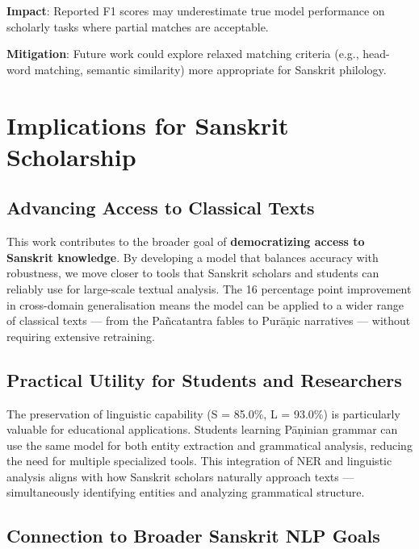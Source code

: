 \textbf{Impact}: Reported F1 scores may underestimate true model performance on scholarly tasks where partial matches are acceptable.

\textbf{Mitigation}: Future work could explore relaxed matching criteria (e.g., head-word matching, semantic similarity) more appropriate for Sanskrit philology.

\section{Implications for Sanskrit Scholarship}

\subsection{Advancing Access to Classical Texts}

This work contributes to the broader goal of \textbf{democratizing access to Sanskrit knowledge}. By developing a model that balances accuracy with robustness, we move closer to tools that Sanskrit scholars and students can reliably use for large-scale textual analysis. The 16 percentage point improvement in cross-domain generalisation means the model can be applied to a wider range of classical texts — from the Pañcatantra \cite{pancatantra_text} fables to Purāṇic \cite{purana} narratives — without requiring extensive retraining.

\subsection{Practical Utility for Students and Researchers}

The preservation of linguistic capability (S = 85.0\%, L = 93.0\%) is particularly valuable for educational applications. Students learning Pāṇinian grammar can use the same model for both entity extraction and grammatical analysis, reducing the need for multiple specialized tools. This integration of NER and linguistic analysis aligns with how Sanskrit scholars naturally approach texts — simultaneously identifying entities and analyzing grammatical structure.

\subsection{Connection to Broader Sanskrit NLP Goals}

